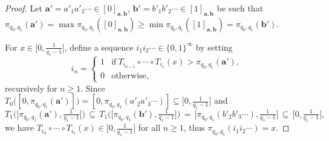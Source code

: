 \documentclass{amsart}
\theoremstyle{definition}
\numberwithin{equation}{section}
\newcommand{\ba}{\mathbf{a}}
\newcommand{\bb}{\mathbf{b}}
\begin{document}
\begin{proof}
Let $\ba' = a'_1a'_2\cdots \in [0]_{\ba,\bb}$, $\bb' = b'_1b'_2\cdots \in [1]_{\ba,\bb}$ be such that $\pi_{q_0,q_1}(\ba') = \max \pi_{q_0,q_1}([0]_{\ba,\bb}) \ge \min \pi_{q_0,q_1}([1]_{\ba,\bb}) = \pi_{q_0,q_1}(\bb')$.

For $x \in \big[0,\frac{1}{q_1-1}\big]$, define a sequence $i_1i_2\cdots \in \{0,1\}^\infty$ by setting
\[
i_n = \begin{cases}1 & \mbox{if}\ T_{i_{n-1}} \circ \cdots \circ T_{i_1}(x) > \pi_{q_0,q_1}(\ba'), \\ 0 & \mbox{otherwise,} \end{cases}
\]
recursively for $n \ge 1$.
Since $T_0\big([0,\pi_{q_0,q_1}(\ba')]\big) = [0,\pi_{q_0,q_1}(a'_2a'_3\cdots)] \subseteq \big[0,\tfrac{1}{q_1-1}\big]$ and 
\[
T_1\big(\big[\pi_{q_0,q_1}(\ba'),\tfrac{1}{q_1-1}\big]\big) {\,\subseteq\,} T_1\big(\big[\pi_{q_0,q_1}(\bb'),\tfrac{1}{q_1-1}\big]\big) {\,=\,} \big[\pi_{q_0,q_1}(b'_2b'_3\cdots),\tfrac{1}{q_1-1}\big] {\,\subseteq\,} \big[0,\tfrac{1}{q_1-1}\big],
\]
we have $T_{i_n} \circ \cdots \circ T_{i_1}(x) \in \big[0,\frac{1}{q_1-1}\big]$ for all $n \ge 1$, thus $\pi_{q_0,q_1}(i_1i_2\cdots) = x$.


\end{proof}
\end{document}
